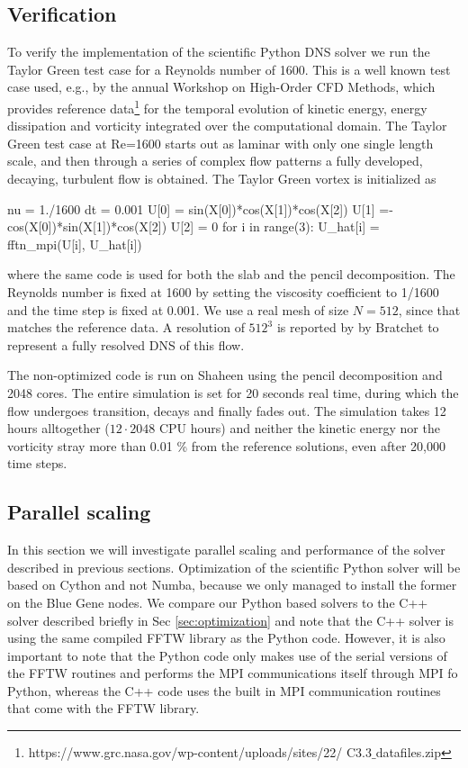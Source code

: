 \documentclass[final,3p,times,twocolumn]{elsarticle}
\begin{document}
\subsection{Verification}
\label{sec:verification}
To verify the implementation of the scientific Python DNS solver we run the 
Taylor Green test case for a Reynolds number of 1600. This is a well known test 
case used, e.g., by the annual Workshop on High-Order CFD Methods, which 
provides reference 
data\footnote{https://www.grc.nasa.gov/wp-content/uploads/sites/22/ 
C3.3$\_$datafiles.zip} for the temporal evolution of kinetic energy, energy 
dissipation and vorticity 
integrated over the computational domain. The Taylor Green test case at Re=1600 
starts out as laminar with only one single length scale, and then through a 
series of complex flow patterns a fully developed, decaying, turbulent flow is 
obtained. The Taylor Green vortex is initialized as
\begin{python}
nu = 1./1600
dt = 0.001
U[0] = sin(X[0])*cos(X[1])*cos(X[2])
U[1] =-cos(X[0])*sin(X[1])*cos(X[2])
U[2] = 0
for i in range(3):
    U_hat[i] = fftn_mpi(U[i], U_hat[i])
\end{python}
where the same code is used for both the slab and the pencil decomposition. The Reynolds number is fixed at 1600 by setting the viscosity coefficient to 1/1600 and the time step is fixed at 0.001. We use a real mesh of size $N=512$, since that matches the reference data. A resolution of $512^3$ is reported by by Bratchet \cite{brachet1991direct} to represent a fully resolved DNS of this flow.

The non-optimized code is run on Shaheen using the pencil decomposition and 2048 cores. The entire simulation is set for 20 seconds real time, during which the flow undergoes transition, decays and finally fades out. The simulation takes 12 hours alltogether ($12\cdot2048$ CPU hours) and neither the kinetic energy nor the vorticity stray more than 0.01 \% from the reference solutions, even after 20,000 time steps.

\subsection{Parallel scaling}
In this section we will investigate parallel scaling and performance of the 
solver described in previous sections. Optimization of the 
scientific Python solver will be based on Cython and not Numba, because we only 
managed to install the former on the Blue Gene nodes. We compare our Python 
based solvers to the C++ solver described briefly in Sec \ref{sec:optimization} 
and note that the C++ solver is using the same compiled FFTW library as the 
Python code. However, it is also important to note that the Python code only 
makes use of the serial versions of the FFTW routines and performs the MPI 
communications itself through MPI fo Python, whereas the C++ code uses the 
built in MPI communication routines that come with the FFTW library.
\end{document}
